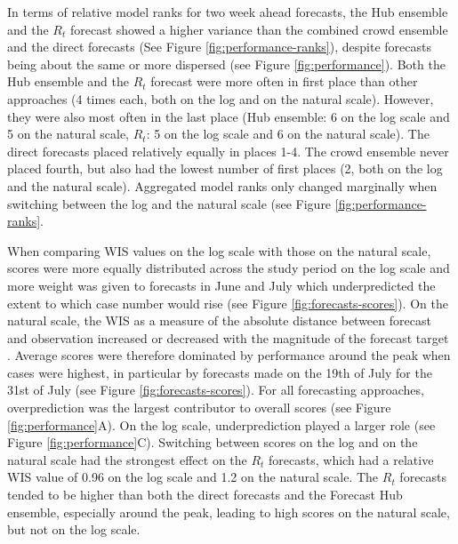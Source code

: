 \documentclass[10pt,a4paper,twocolumn]{article}
\begin{document}
In terms of relative model ranks for two week ahead forecasts, the Hub ensemble and the $R_t$ forecast showed a higher variance than the combined crowd ensemble and the direct forecasts (See Figure \ref{fig:performance-ranks}), despite forecasts being about the same or more dispersed (see Figure \ref{fig:performance}). Both the Hub ensemble and the $R_t$ forecast were more often in first place than other approaches (4 times each, both on the log and on the natural scale). However, they were also most often in the last place (Hub ensemble: 6 on the log scale and 5 on the natural scale, $R_t$: 5 on the log scale and 6 on the natural scale). The direct forecasts placed relatively equally in places 1-4. The crowd ensemble never placed fourth, but also had the lowest number of first places (2, both on the log and the natural scale). Aggregated model ranks only changed marginally when switching between the log and the natural scale (see Figure \ref{fig:performance-ranks}. 

When comparing WIS values on the log scale with those on the natural scale, scores were more equally distributed across the study period on the log scale and more weight was given to forecasts in June and July which underpredicted the extent to which case number would rise (see Figure \ref{fig:forecasts-scores}).
On the natural scale, the WIS as a measure of the absolute distance between forecast and observation increased or decreased with the magnitude of the forecast target \cite{bosseTransformationForecastsEvaluating2023, bracherEvaluatingEpidemicForecasts2021}. Average scores were therefore dominated by performance around the peak when cases were highest, in particular by forecasts made on the 19th of July for the 31st of July (see Figure \ref{fig:forecasts-scores}). For all forecasting approaches, overprediction was the largest contributor to overall scores (see Figure \ref{fig:performance}A). On the log scale, underprediction played a larger role (see Figure \ref{fig:performance}C). Switching between scores on the log and on the natural scale had the strongest effect on the $R_t$ forecasts, which had a relative WIS value of 0.96 on the log scale and 1.2 on the natural scale. The $R_t$ forecasts tended to be higher than both the direct forecasts and the Forecast Hub ensemble, especially around the peak, leading to high scores on the natural scale, but not on the log scale. 
\end{document}
